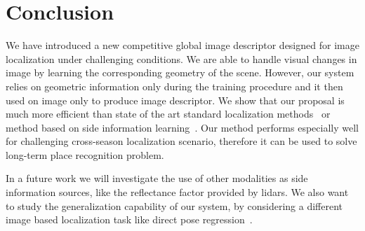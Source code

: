 \section{Conclusion}
\label{sec:conclusion}

We have introduced a new competitive global image descriptor designed for image localization under challenging conditions. We are able to handle visual changes in image by learning the corresponding geometry of the scene. However, our system relies on geometric information only during the training procedure and it then used on image only to produce image descriptor. We show that our proposal is much more efficient than state of the art standard localization methods~\cite{Arandjelovic2017, Radenovic2017} or method based on side information learning~\cite{Hoffman2016}. Our method performs especially well for challenging cross-season localization scenario, therefore it can be used to solve long-term place recognition problem.

In a future work we will investigate the use of other modalities as side information sources, like the reflectance factor provided by lidars. We also want to study the generalization capability of our system, by considering a different image based localization task like direct pose regression~\cite{Brachmann2018}.
